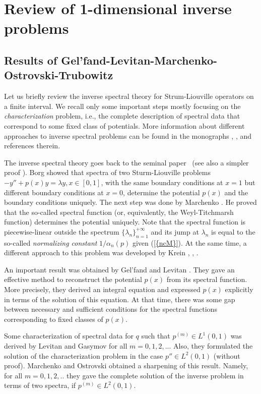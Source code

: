 \documentclass[10pt]{amsart}
\begin{document}
\section {Review of 1-dimensional inverse problems}
\setcounter{equation}{0}

\subsection {\bf Results of Gel'fand-Levitan-Marchenko-Ostrovski-Trubowitz}
 Let us briefly review the inverse spectral
theory for Strum-Liouville operators on a finite interval. We recall only some
important steps mostly focusing on the {\it characterization} problem, i.e.,
the complete description of spectral data that correspond to some fixed class
of potentials. More information about different approaches to inverse spectral
 problems can be found in the monographs \cite{M77}, \cite{L84},
 \cite{PT87} and references therein.

The inverse spectral theory goes back to the seminal \mbox{paper
\cite{Bo46}} (see also a simpler proof \cite{Le49}). Borg showed
that spectra of two Sturm-Liouville problems $-y''+p(x)y={\lambda} y, x\in
[0,1]$, with the same boundary conditions at $x=1$ but different
boundary  conditions at $x=0$, determine the potential $p(x)$ and
the boundary conditions uniquely. The next step was done by
Marchenko \cite{M50}. He  proved that the so-called spectral
function (or, equivalently, the Weyl-Titchmarsh function) determines
 the potential uniquely. Note that the spectral function is
 piecewise-linear outside the spectrum $\{{\lambda}_n\}_{n=1}^{+{\infty}}$
and its jump at ${\lambda}_n$ is equal to the so-called {\it normalizing constant}
${1/{\alpha}_n(p)}$
given {\textrm{(\ref{{ncM}})}}.
 At the same time, a different approach to this problem was
developed by Krein \cite{Kr51}, \cite{Kr53}, \cite{Kr54}.

An important result was obtained by Gel'fand and Levitan \cite{GL51}.
They gave an effective method to reconstruct the potential $p(x)$
 from its spectral function. More precisely, they derived an integral
  equation and expressed $p(x)$ explicitly in terms of the solution of
this equation. At that time, there was some gap between necessary and
 sufficient conditions
for the spectral functions corresponding to fixed classes of $p(x)$.

Some characterization of spectral data for $q$ such that
$p^{(m)}\in L^1(0,1)$ was derived by Levitan and Gasymov \cite{LG64}
for all $m=0,1,2,..$. Also, they formulated the solution of
the characterization problem in the case $p''\in L^2(0,1)$ (without proof).
Marchenko and Ostrovski \cite{MO75} obtained a sharpening of this result.
Namely, for all $m=0,1,2,..$ they gave the complete
solution of the inverse problem in terms of two spectra,
if $p^{(m)}\in L^2(0,1)$.
\end{document}
